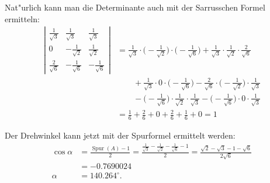 \begin{loesung}
\begin{teilaufgaben}
Nat"urlich kann man die Determinante auch mit der Sarrusschen Formel ermitteln:
\begin{align*}
\left|
\begin{matrix}
\frac1{\sqrt{3}}&\frac1{\sqrt{3}}&\frac1{\sqrt{3}}\\
0&-\frac1{\sqrt{2}}&\frac1{\sqrt{2}}\\
\frac2{\sqrt{6}}&-\frac1{\sqrt{6}}&-\frac1{\sqrt{6}}
\end{matrix}
\right|
&=
\frac1{\sqrt{3}}\cdot\biggl(-\frac1{\sqrt{2}}\biggr)\cdot\biggl(-\frac1{\sqrt{6}}\biggr)
+
\frac1{\sqrt{3}}\cdot\frac1{\sqrt{2}}\cdot\frac2{\sqrt{6}}
\\
&\qquad 
+
\frac1{\sqrt{3}}\cdot0\cdot\biggl(-\frac1{\sqrt{6}}\biggr)
-
\frac2{\sqrt{6}}\cdot\biggl(-\frac1{\sqrt{2}}\biggr)\cdot\frac1{\sqrt{3}}
\\
&\qquad
-
\biggl(-\frac1{\sqrt{6}}\biggr)\cdot\frac1{\sqrt{2}}\cdot \frac1{\sqrt{3}}
-
\biggl(-\frac1{\sqrt{6}}\biggr)\cdot0\cdot\frac1{\sqrt{3}}
\\
&=
\frac16+\frac26+0+\frac26+\frac16+0=1
\end{align*}
\item
Der Drehwinkel kann jetzt mit der Spurformel ermittelt werden:
\begin{align*}
\cos \alpha
&=\frac{\operatorname{Spur}(A)-1}2
=\frac{\frac1{\sqrt{3}}-\frac1{\sqrt{2}}-\frac1{\sqrt{6}}-1}2
=\frac{\sqrt{2}-\sqrt{3}-1-\sqrt{6}}{2\sqrt{6}}
\\
&=-0.7690024
\\
\alpha&=140.264^\circ.
\end{align*}
\end{teilaufgaben}
\end{loesung}

